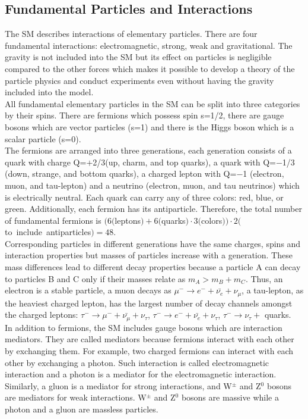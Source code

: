\subsection{Fundamental Particles and Interactions}
\label{sec:Intro_FundParticles}

The SM describes interactions of elementary particles. There are four fundamental interactions: electromagnetic, strong, weak and gravitational. The gravity is not included into the SM but its effect on particles is negligible compared to the other forces which makes it possible to develop a theory of the particle physics and conduct experiments even without having the gravity included into the model.\\ 

All fundamental elementary particles in the SM can be split into three categories by their spins. There are fermions which possess spin s=1/2, there are gauge bosons which are vector particles (s=1) and there is the Higgs boson which is a scalar particle (s=0). \\

The fermions are arranged into three generations, each generation consists of a quark with charge Q=$+$2/3(up, charm, and top quarks), a quark with Q=$-$1/3 (down, strange, and bottom quarks), a charged lepton with Q=$-$1 (electron, muon, and tau-lepton) and a neutrino (electron, muon, and tau neutrinos) which is electrically neutral. Each quark can carry any of three colors: red, blue, or green. Additionally, each fermion has its antiparticle. Therefore, the total number of fundamental fermions is $(6 ($leptons$)+6 ($quarks$) \cdot 3 ($colors$) ) \cdot 2 ($to~include~antiparticles$) = 48$.\\ 

Corresponding particles in different generations have the same charges, spins and interaction properties but masses of particles increase with a generation. These mass differences lead to different decay properties because a particle A can decay to particles B and C only if their masses relate as $m_A > m_B + m_C$. Thus, an electron is a stable particle, a muon decays as $\mu^- \rightarrow e^- + \bar{\nu_e} + \nu_\mu$, a tau-lepton, as the heaviest charged lepton, has the largest number of decay channels amongst the charged leptons: $\tau^- \rightarrow \mu^- + \bar{\nu_\mu} + \nu_\tau$, $\tau^- \rightarrow e^- + \bar{\nu_e} + \nu_\tau$,  $\tau^- \rightarrow \nu_\tau +$ quarks. \\

In addition to fermions, the SM includes gauge bosons which are interaction mediators. They are called mediators because fermions interact with each other by exchanging them. For example, two charged fermions can interact with each other by exchanging a photon. Such interaction is called electromagnetic interaction and a photon is a mediator for the electromagnetic interaction. Similarly, a gluon is a mediator for strong interactions, and W$^{\pm}$ and Z$^0$ bosons are mediators for weak interactions. W$^{\pm}$ and Z$^0$ bosons are massive while a photon and a gluon are massless particles. \\


